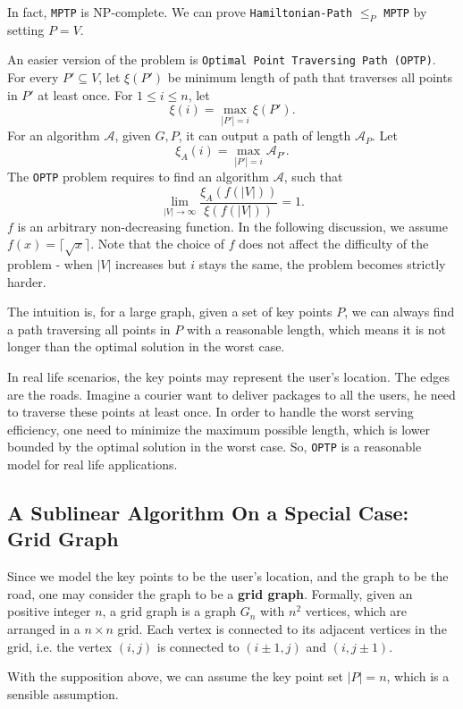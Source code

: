\documentclass[11pt]{article}
\theoremstyle{plain}
\begin{document}
In fact, \texttt{MPTP} is NP-complete. We can prove \texttt{Hamiltonian-Path} $\le_P$ \texttt{MPTP} by setting $P=V$.

An easier version of the problem is \texttt{Optimal Point Traversing Path (OPTP)}. For every $P'\subseteq V$, let $\xi(P')$ be minimum length of path that traverses all points in $P'$ at least once. For $1\le i\le n$, let
$$\xi(i) = \max\limits_{|P'|=i} \xi(P').$$
For an algorithm $\mathcal{A}$, given $G,P$, it can output a path of length $\mathcal{A}_P$. Let
$$\xi_A(i) = \max\limits_{|P'|=i} \mathcal{A}_{P'}.$$
The \texttt{OPTP} problem requires to find an algorithm $\mathcal{A}$, such that
$$\lim\limits_{|V|\to \infty} \dfrac{\xi_A(f(|V|))}{\xi(f(|V|))}=1.$$
$f$ is an arbitrary non-decreasing function. In the following discussion, we assume $f(x)=\lceil\sqrt{x}\rceil$. Note that the choice of $f$ does not affect the difficulty of the problem - when $|V|$ increases but $i$ stays the same, the problem becomes strictly harder.

The intuition is, for a large graph, given a set of key points $P$, we can always find a path traversing all points in $P$ with a reasonable length, which means it is not longer than the optimal solution in the worst case. 

In real life scenarios, the key points may represent the user's location. The edges are the roads. Imagine a courier want to deliver packages to all the users, he need to traverse these points at least once. In order to handle the worst serving efficiency, one need to minimize the maximum possible length, which is lower bounded by the optimal solution in the worst case. So, \texttt{OPTP} is a reasonable model for real life applications.

\subsection{A Sublinear Algorithm On a Special Case: Grid Graph}

Since we model the key points to be the user's location, and the graph to be the road, one may consider the graph to be a \textbf{grid graph}. Formally, given an positive integer $n$, a grid graph is a graph $G_n$ with $n^2$ vertices, which are arranged in a $n\times n$ grid. Each vertex is connected to its adjacent vertices in the grid, i.e. the vertex $(i,j)$ is connected to $(i\pm 1,j)$ and $(i,j\pm 1)$.

With the supposition above, we can assume the key point set $|P|=n$, which is a sensible assumption.
\end{document}
